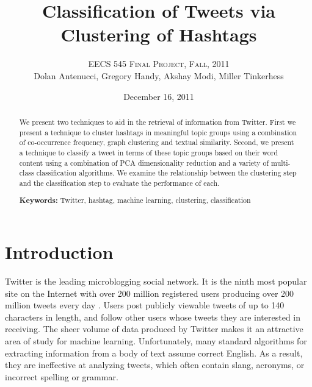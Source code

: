 
\begin{abstract}
We present two techniques to aid in the retrieval of information from Twitter. First we present a technique to cluster hashtags in meaningful topic groups using a combination of co-occurrence frequency, graph clustering and textual similarity. Second, we present a technique to classify a tweet in terms of these topic groups based on their word content using a combination of PCA dimensionality reduction and a variety of multi-class classification algorithms. We examine the relationship between the clustering step and the classification step to evaluate the performance of each.

\vspace{0.1in}
\begin{flushleft}
\textbf{Keywords:} Twitter, hashtag, machine learning, clustering, classification
\end{flushleft}
%
\end{abstract}


\title{Classification of Tweets via Clustering of Hashtags}
\author{\fontsize{12.5}{1}\textsc{EECS 545 Final Project, Fall, 2011}\selectfont
\vspace{0.2in} \\ \footnotesize{Dolan Antenucci, Gregory Handy, Akshay Modi,
Miller Tinkerhess } }


\date{December 16, 2011}

\maketitle


\section{Introduction}
Twitter is the leading microblogging social network. It is the ninth most popular site on the Internet with over 200 million registered users producing over 200 million tweets every day \cite{Shiels2011,Alexa2011,Twitter.com2011}. Users post publicly viewable tweets of up to 140 characters in length, and follow other users whose tweets they are interested in receiving. The sheer volume of data produced by Twitter makes it an attractive area of study for machine learning. Unfortunately, many standard algorithms for extracting information from a body of text assume correct English. As a result, they are ineffective at analyzing tweets, which often contain slang, acronyms, or incorrect spelling or grammar.

